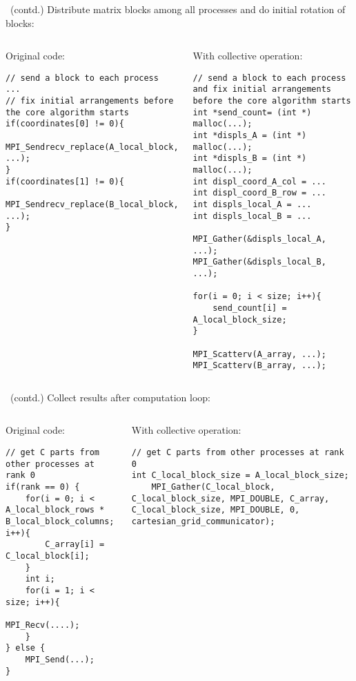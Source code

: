 \documentclass[9pt,pdftex,xcolor=dvipsnames]{beamer}
\begin{document}
\begin{frame}[fragile]{\insertsubsection \ (contd.)}
Distribute matrix blocks among all processes and do initial rotation of blocks:
\begin{columns}
\begin{block}{Original code:}
\begin{lstlisting}
// send a block to each process
...
// fix initial arrangements before the core algorithm starts
if(coordinates[0] != 0){
    MPI_Sendrecv_replace(A_local_block, ...);
}
if(coordinates[1] != 0){
    MPI_Sendrecv_replace(B_local_block, ...);
}
\end{lstlisting}
\end{block}

\begin{block}{With collective operation:}
\begin{lstlisting}	
// send a block to each process and fix initial arrangements before the core algorithm starts
int *send_count= (int *) malloc(...);
int *displs_A = (int *) malloc(...);
int *displs_B = (int *) malloc(...);
int displ_coord_A_col = ... 
int displ_coord_B_row = ...
int displs_local_A = ...
int displs_local_B = ...

MPI_Gather(&displs_local_A, ...);
MPI_Gather(&displs_local_B, ...);  
  
for(i = 0; i < size; i++){
	send_count[i] = A_local_block_size;
}

MPI_Scatterv(A_array, ...);
MPI_Scatterv(B_array, ...);
\end{lstlisting}
\end{block}
\end{columns}
\end{frame}


\begin{frame}[fragile]{\insertsubsection \ (contd.)}
Collect results after computation loop:
\begin{columns}
\begin{block}{Original code:}
\begin{lstlisting}
// get C parts from other processes at rank 0
if(rank == 0) {
    for(i = 0; i < A_local_block_rows * B_local_block_columns; i++){
        C_array[i] = C_local_block[i];
    }
    int i;
    for(i = 1; i < size; i++){
        MPI_Recv(....);
    }
} else {
    MPI_Send(...);
}
\end{lstlisting}
\end{block}

\begin{block}{With collective operation:}
\begin{lstlisting}	
// get C parts from other processes at rank 0
int C_local_block_size = A_local_block_size;
	MPI_Gather(C_local_block, C_local_block_size, MPI_DOUBLE, C_array, C_local_block_size, MPI_DOUBLE, 0, cartesian_grid_communicator);
\end{lstlisting}
\end{block}
\end{columns}
\end{frame}
	
\end{document}
